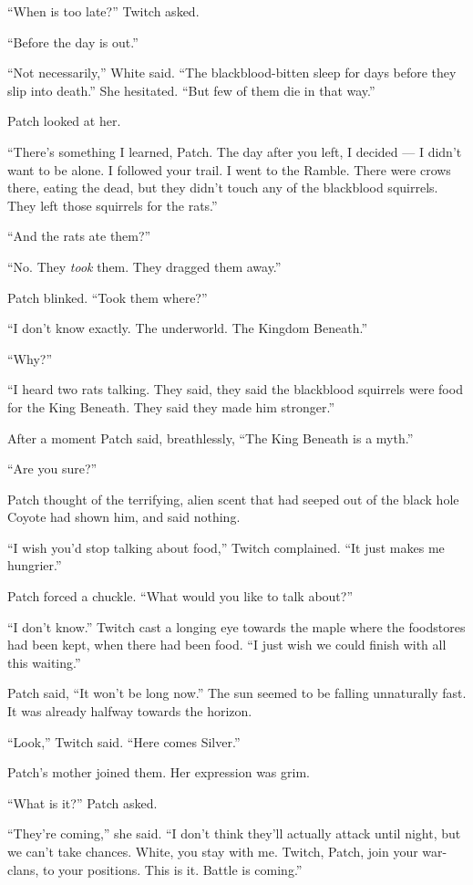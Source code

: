 \documentclass[ebook,oneside,openany,17pt]{memoir}
\newenvironment{tolerant}[1]{%
  \par\tolerance=#1\relax
}{%
  \par
}
\begin{document}
“When is too late?” Twitch asked.

“Before the day is out.”

“Not necessarily,” White said. “The blackblood-bitten sleep for days
before they slip into death.” She hesitated. “But few of them die in
that way.”

Patch looked at her.

“There’s something I learned, Patch. The day after you left, I decided
— I didn’t want to be alone. I followed your trail. I went to the
Ramble. There were crows there, eating the dead, but they didn’t touch
any of the blackblood squirrels. They left those squirrels for the
rats.”

“And the rats ate them?”

“No. They \emph{took} them. They dragged them away.”

Patch blinked. “Took them where?”

“I don’t know exactly. The underworld. The Kingdom Beneath.”

“Why?”

“I heard two rats talking. They said, they said the blackblood
squirrels were food for the King Beneath. They said they made him
stronger.”

After a moment Patch said, breathlessly, “The King Beneath is a myth.”

“Are you sure?”

Patch thought of the terrifying, alien scent that had seeped out of
the black hole Coyote had shown him, and said nothing.

“I wish you’d stop talking about food,” Twitch complained. “It just
makes me hungrier.”

Patch forced a chuckle. “What would you like to talk about?”

“I don’t know.” Twitch cast a longing eye towards the maple where the
foodstores had been kept, when there had been food. “I just wish we
could finish with all this waiting.”

\begin{tolerant}{500}
Patch said, “It won’t be long now.” The sun seem\-ed to be falling
unnaturally fast. It was already half\-way towards the horizon.
\end{tolerant}

“Look,” Twitch said. “Here comes Silver.”

Patch’s mother joined them. Her expression was grim.

“What is it?” Patch asked.

“They’re coming,” she said. “I don’t think they’ll actually attack
until night, but we can’t take chances. White, you stay with
me. Twitch, Patch, join your war-clans, to your positions. This is
it. Battle is coming.”
\end{document}
